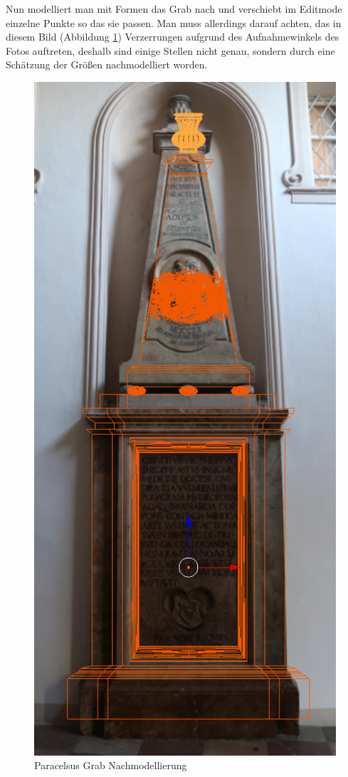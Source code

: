 Nun modelliert man mit Formen das Grab nach und verschiebt im Editmode einzelne Punkte so das sie passen. Man muss allerdings darauf achten, das in diesem Bild
(Abbildung \ref{Paracelsus_Grab:image2}) Verzerrungen aufgrund des Aufnahmewinkels des Fotos auftreten, deshalb sind einige Stellen nicht genau, sondern
durch eine Schätzung der Größen nachmodelliert worden.

\begin{figure}[h]
    \centering
    \includegraphics[width=.8\textwidth]{images/Paracelsus-Grab_Nachmodellierung.png}
    \caption{Paracelsus Grab Nachmodellierung}
    \label{Paracelsus_Grab:image2}
\end{figure}

